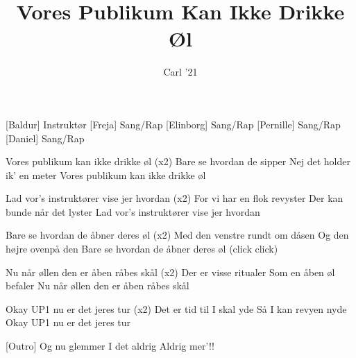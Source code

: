 \documentclass[a4paper,11pt]{article}
\title{Vores Publikum Kan Ikke Drikke Øl}
\author{Carl '21}
\begin{document}
\maketitle

\begin{roles}
[Baldur] Instruktør
[Freja] Sang/Rap
[Elinborg] Sang/Rap
[Pernille] Sang/Rap
[Daniel] Sang/Rap
\end{roles}

\begin{song}


 Vores publikum kan ikke drikke øl (x2)
    Bare se hvordan de sipper
    Nej det holder ik' en meter
    Vores publikum kan ikke drikke øl

    Lad vor's instruktører vise jer hvordan (x2)
    For vi har en flok revyster
    Der kan bunde når det lyster
    Lad vor's instruktører vise jer hvordan


 Bare se hvordan de åbner deres øl (x2)
    Med den venstre rundt om dåsen
    Og den højre ovenpå den
    Bare se hvordan de åbner deres øl (click click)

    Nu når øllen den er åben råbes skål (x2)
    Der er visse ritualer
    Som en åben øl befaler
    Nu når øllen den er åben råbes skål


 Okay UP1 nu er det jeres tur (x2)
    Det er tid til I skal yde
    Så I kan revyen nyde
    Okay UP1 nu er det jeres tur



[Outro] Og nu glemmer
    I det aldrig
    Aldrig mer'!!
\end{song}
\end{document}
